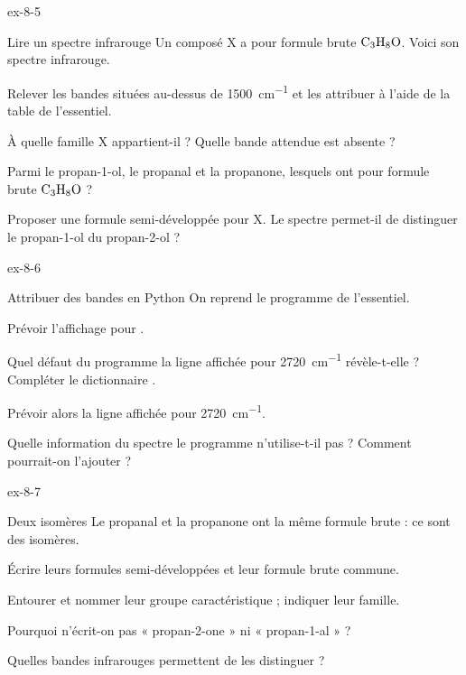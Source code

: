 \begin{blocLivre}{ex-8-5}
\begin{exercice}[1]{Lire un spectre infrarouge}
Un composé X a pour formule brute $\ce{C3H8O}$. Voici son spectre infrarouge.
\begin{questions}
\item Relever les bandes situées au-dessus de \qty{1500}{cm^{-1}} et les attribuer à l'aide de la table de l'essentiel.
\item À quelle famille X appartient-il ? Quelle bande attendue est absente ?
\item Parmi le propan-1-ol, le propanal et la propanone, lesquels ont pour formule brute $\ce{C3H8O}$ ?
\item Proposer une formule semi-développée pour X. Le spectre permet-il de distinguer le propan-1-ol du propan-2-ol ?
\end{questions}
\end{exercice}
\end{blocLivre}
\begin{blocLivre}{ex-8-6}
\begin{exercice}[2]{Attribuer des bandes en Python}
On reprend le programme de l'essentiel.
\begin{questions}
\item {}Prévoir l'affichage pour .
\item Quel défaut du programme la ligne affichée pour \qty{2720}{cm^{-1}} révèle-t-elle ? Compléter le dictionnaire .
\item Prévoir alors la ligne affichée pour \qty{2720}{cm^{-1}}.
\item Quelle information du spectre le programme n'utilise-t-il pas ? Comment pourrait-on l'ajouter ?
\end{questions}
\end{exercice}
\end{blocLivre}
\begin{blocLivre}{ex-8-7}
\begin{exercice}[2]{Deux isomères}
Le propanal et la propanone ont la même formule brute : ce sont des isomères.
\begin{questions}
\item Écrire leurs formules semi-développées et leur formule brute commune.
\item Entourer et nommer leur groupe caractéristique ; indiquer leur famille.
\item Pourquoi n'écrit-on pas « propan-2-one » ni « propan-1-al » ?
\item Quelles bandes infrarouges permettent de les distinguer ?
\end{questions}
\end{exercice}
\end{blocLivre}
